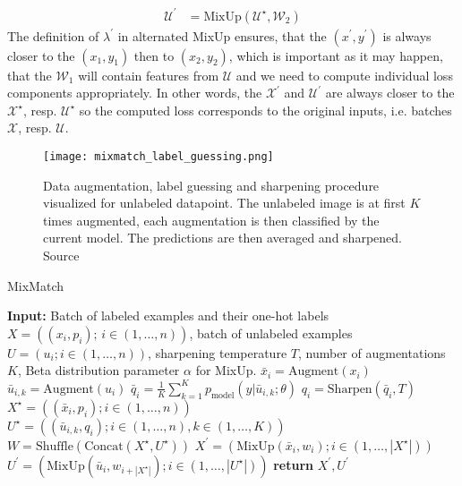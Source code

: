 \begin{enumerate}
\begin{align*}
            \mathcal{U}^\prime &= \text{MixUp}(\mathcal{U}^\star,\mathcal{W}_2)
        \end{align*}
        The definition of $\lambda^\prime$ in alternated MixUp ensures, that the $(x^\prime,y^\prime)$ is always closer to the 
        $(x_1,y_1)$ then to $(x_2,y_2)$, which is important as it may happen, that the $\mathcal{W}_1$ will contain features from $\mathcal{U}$
        and we need to compute individual loss components appropriately. In other words, the $\mathcal{X}^\prime$ and $\mathcal{U}^\prime$ are always 
        closer to the $\mathcal{X}^\star$, resp. $\mathcal{U}^\star$ so the computed loss corresponds to the original inputs, i.e. batches $\mathcal{X}$, 
        resp. $\mathcal{U}$.
\end{enumerate}
\begin{figure}[t]
    \centering
    \texttt{[image: mixmatch\_label\_guessing.png]}
    \caption[Mixmatch label guessing]{Data augmentation, label guessing and sharpening procedure visualized for unlabeled datapoint. The unlabeled image is at first $K$ 
    times augmented, each augmentation is then classified by the current model. The predictions are then averaged and sharpened. 
    Source \cite{mixmatch-2019}}
    \label{fig:mixmatch}
\end{figure}

\begin{algorithm}[H]
 \caption{MixMatch}
 \label{alg:mixmatch}
 \begin{algorithmic}[1]
   \State \textbf{Input:} Batch of labeled examples and their one-hot labels $X = ((x_i, p_i);\,i \in (1, \dots, n))$, batch of unlabeled examples $U = (u_i; i \in (1, \dots, n))$, sharpening temperature $T$, number of augmentations $K$, Beta distribution parameter $\alpha$ for MixUp.
    \State $\bar{x}_i = \text{Augment}(x_i)$ 
     \State $\bar{u}_{i,k} = \text{Augment}(u_i)$ 
    \EndFor
    \State $\bar{q}_i = \frac{1}{K} \sum_{k=1}^{K} p_{\text{model}}(y|\bar{u}_{i,k}; \theta)$ 
    \State $q_i = \text{Sharpen}(\bar{q}_i, T)$ 
   \EndFor
   \State $X^\star = ((\bar{x}_i, p_i); i \in (1, \dots, n))$ 
   \State $U^\star = ((\bar{u}_{i,k}, q_i); i \in (1, \dots, n), k \in (1, \dots, K))$ 
   \State $W = \text{Shuffle}(\text{Concat}(X^\star, U^\star))$ 
   \State $X^\prime = (\text{MixUp}(\bar{x}_i, w_i); i \in (1, \dots, |X^\star|))$ 
   \State $U^\prime = (\text{MixUp}(\bar{u}_{i}, w_{i+|X^\star|}); i \in (1, \dots, |U^\star|))$ 
   \State \textbf{return} $X^\prime, U^\prime$
   
 \end{algorithmic}
\end{algorithm}

